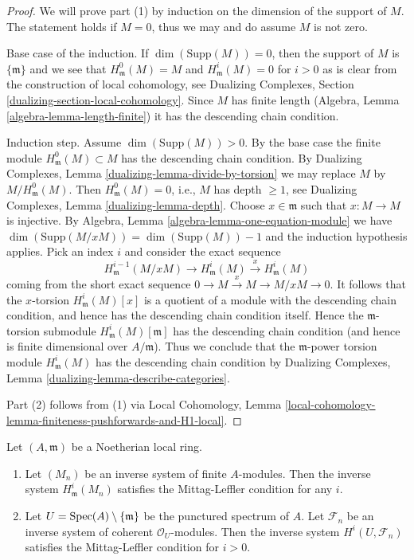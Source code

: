 \begin{proof}
We will prove part (1) by induction on the dimension of the support of $M$.
The statement holds if $M = 0$, thus we may and do assume $M$ is not zero.

\medskip\noindent
Base case of the induction.
If $\dim(\text{Supp}(M)) = 0$, then the support
of $M$ is $\{\mathfrak m\}$ and we see that $H^0_\mathfrak m(M) = M$
and $H^i_\mathfrak m(M) = 0$ for $i > 0$ as is clear from the
construction of local cohomology, see
Dualizing Complexes, Section \ref{dualizing-section-local-cohomology}.
Since $M$ has finite length (Algebra, Lemma \ref{algebra-lemma-length-finite})
it has the descending chain condition.

\medskip\noindent
Induction step. Assume $\dim(\text{Supp}(M)) > 0$.
By the base case the finite module $H^0_\mathfrak m(M) \subset M$
has the descending chain condition.
By Dualizing Complexes, Lemma \ref{dualizing-lemma-divide-by-torsion}
we may replace $M$ by $M/H^0_\mathfrak m(M)$.
Then $H^0_\mathfrak m(M) = 0$, i.e., $M$ has depth $\geq 1$, see
Dualizing Complexes, Lemma \ref{dualizing-lemma-depth}.
Choose $x \in \mathfrak m$ such that $x : M \to M$ is injective.
By Algebra, Lemma \ref{algebra-lemma-one-equation-module} we have
$\dim(\text{Supp}(M/xM)) = \dim(\text{Supp}(M)) - 1$ and the
induction hypothesis applies. Pick an index $i$ and consider the
exact sequence
$$
H^{i - 1}_\mathfrak m(M/xM) \to H^i_\mathfrak m(M) \xrightarrow{x}
H^i_\mathfrak m(M)
$$
coming from the short exact sequence $0 \to M \xrightarrow{x} M \to M/xM \to 0$.
It follows that the $x$-torsion $H^i_\mathfrak m(M)[x]$
is a quotient of a module with the descending chain condition, and
hence has the descending chain condition itself. Hence the
$\mathfrak m$-torsion submodule $H^i_\mathfrak m(M)[\mathfrak m]$ has
the descending chain condition (and hence is finite dimensional
over $A/\mathfrak m$). Thus we conclude that the $\mathfrak m$-power
torsion module $H^i_\mathfrak m(M)$ has the descending chain
condition by Dualizing Complexes, Lemma
\ref{dualizing-lemma-describe-categories}.

\medskip\noindent
Part (2) follows from (1) via Local Cohomology,
Lemma \ref{local-cohomology-lemma-finiteness-pushforwards-and-H1-local}.
\end{proof}

\begin{lemma}
\label{lemma-ML-local}
Let $(A, \mathfrak m)$ be a Noetherian local ring.
\begin{enumerate}
\item Let $(M_n)$ be an inverse system of finite $A$-modules. Then the
inverse system $H^i_\mathfrak m(M_n)$ satisfies the Mittag-Leffler
condition for any $i$.
\item Let $U = \mathop{\mathrm{Spec}}(A) \setminus \{\mathfrak m\}$ be the
punctured spectrum of $A$.
Let $\mathcal{F}_n$ be an inverse system of
coherent $\mathcal{O}_U$-modules.
Then the inverse system $H^i(U, \mathcal{F}_n)$
satisfies the Mittag-Leffler condition for $i > 0$.
\end{enumerate}
\end{lemma}

